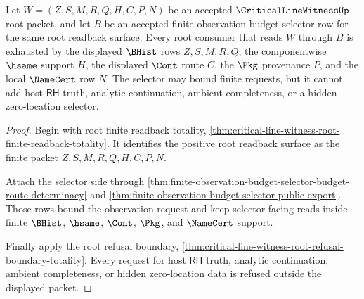 \begin{theorem}
\label{thm:critical-line-witness-root-budget-selector-totality}
Let $W=(Z,S,M,R,Q,H,C,P,N)$ be an accepted $\CriticalLineWitnessUp$ root packet, and let $B$ be an accepted finite observation-budget selector row for the same root readback surface. Every root consumer that reads $W$ through $B$ is exhausted by the displayed $\BHist$ rows $Z,S,M,R,Q$, the componentwise $\hsame$ support $H$, the displayed $\Cont$ route $C$, the $\Pkg$ provenance $P$, and the local $\NameCert$ row $N$. The selector may bound finite requests, but it cannot add host $\mathsf{RH}$ truth, analytic continuation, ambient completeness, or a hidden zero-location selector.
\end{theorem}
\begin{proof}
Begin with root finite readback totality, \autoref{thm:critical-line-witness-root-finite-readback-totality}. It identifies the positive root readback surface as the finite packet $Z,S,M,R,Q,H,C,P,N$.

Attach the selector side through \autoref{thm:finite-observation-budget-selector-budget-route-determinacy} and \autoref{thm:finite-observation-budget-selector-public-export}. Those rows bound the observation request and keep selector-facing reads inside finite $\BHist$, $\hsame$, $\Cont$, $\Pkg$, and $\NameCert$ support.

Finally apply the root refusal boundary, \autoref{thm:critical-line-witness-root-refusal-boundary-totality}. Every request for host $\mathsf{RH}$ truth, analytic continuation, ambient completeness, or hidden zero-location data is refused outside the displayed packet.
\end{proof}

